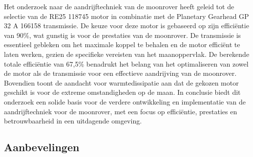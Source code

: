 Het onderzoek naar de aandrijftechniek van de moonrover heeft geleid tot de selectie van de RE25 118745 motor in combinatie met de Planetary Gearhead GP 32 A 166158 transmissie. De keuze voor deze motor is gebaseerd op zijn efficiëntie van 90\%, wat gunstig is voor de prestaties van de moonrover. De transmissie is essentieel gebleken om het maximale koppel te behalen en de motor efficiënt te laten werken, gezien de specifieke vereisten van het maanoppervlak. De berekende totale efficiëntie van 67,5\% benadrukt het belang van het optimaliseren van zowel de motor als de transmissie voor een effectieve aandrijving van de moonrover. Bovendien toont de aandacht voor warmtedissipatie aan dat de gekozen motor geschikt is voor de extreme omstandigheden op de maan. In conclusie biedt dit onderzoek een solide basis voor de verdere ontwikkeling en implementatie van de aandrijftechniek voor de moonrover, met een focus op efficiëntie, prestaties en betrouwbaarheid in een uitdagende omgeving.

\subsection*{Aanbevelingen}

